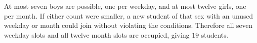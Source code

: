 At most seven boys are possible, one per weekday, and at most twelve girls, one per month. If either count were smaller, a new student of that sex with an unused weekday or month could join without violating the conditions. Therefore all seven weekday slots and all twelve month slots are occupied, giving $\boxed{19}$ students.

